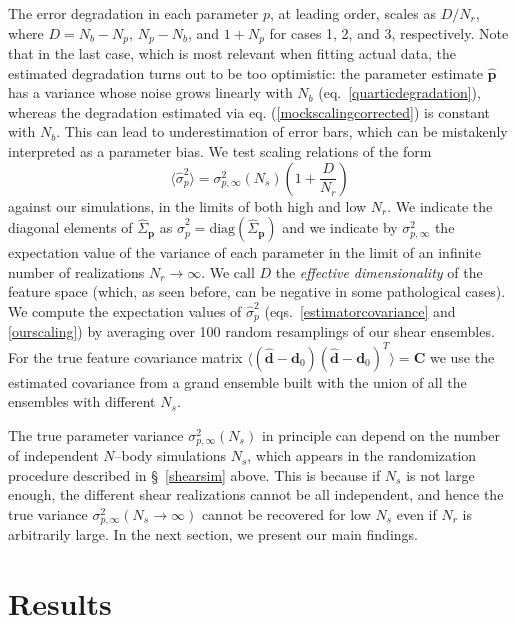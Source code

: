 \documentclass[reprint,aps,prd,superscriptaddress,showkeys,showpacs]{revtex4-1}
\newcommand{\bb}[1]{\mathbf{#1}}
\newcommand{\bbh}[1]{\mathbf{\hat{#1}}}
\newcommand{\h}[1]{\hat{#1}}
\begin{document}
%
The error degradation in each parameter $p$, at leading order, scales
as $D/N_r$, where $D=N_b-N_p$, $N_p-N_b$, and $1+N_p$ for cases 1, 2,
and 3, respectively.  Note that in the last case, which is most
relevant when fitting actual data, the estimated degradation turns out
to be too optimistic: the parameter estimate $\bbh{p}$ has a variance
whose noise grows linearly with $N_b$ (eq.~\ref{quarticdegradation}),
whereas the degradation estimated via eq. (\ref{mockscalingcorrected})
is constant with $N_b$. This can lead to underestimation of error
bars, which can be mistakenly interpreted as a parameter bias. We test
scaling relations of the form
%
\begin{equation}
\label{ourscaling}
\langle\h{\sigma}_p^2\rangle = \sigma^2_{p,\infty}(N_s)\left(1+\frac{D}{N_r}\right)
\end{equation}
%
against our simulations, in the limits of both high and low $N_r$.  We
indicate the diagonal elements of $\h{\Sigma}_{\bb{p}}$ as
$\h{\sigma}^2_p=\mathrm{diag}(\h{\Sigma}_{\bb{p}})$ and we indicate by
$\sigma^2_{p,\infty}$ the expectation value of the variance of each
parameter in the limit of an infinite number of realizations
$N_r\rightarrow\infty$.  We call $D$ the \textit{effective
  dimensionality} of the feature space (which, as seen before, can be
negative in some pathological cases).  We compute the expectation
values of $\h{\sigma}^2_p$ (eqs.~\ref{estimatorcovariance} and
\ref{ourscaling}) by averaging over 100 random resamplings of our
shear ensembles. For the true feature covariance matrix
$\langle(\bbh{d}-\bb{d}_0)(\bbh{d}-\bb{d}_0)^T\rangle=\bb{C}$ we use
the estimated covariance from a grand ensemble built with the union of
all the ensembles with different $N_s$.

The true parameter variance $\sigma^2_{p,\infty}(N_s)$ in principle
can depend on the number of independent $N$--body simulations $N_s$,
which appears in the randomization procedure described in
\S~\ref{shearsim} above. This is because if $N_s$ is not large enough,
the different shear realizations cannot be all independent, and hence
the true variance $\sigma^2_{p,\infty}(N_s\rightarrow\infty)$ cannot
be recovered for low $N_s$ even if $N_r$ is arbitrarily large. In the
next section, we present our main findings.
 


\section{Results} 
\end{document}
